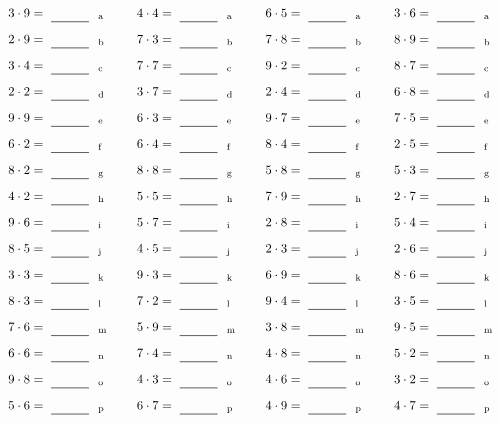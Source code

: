 \documentclass
[
  draft    = true,
  fontsize = 11pt,
  parskip  = half-
]
{scrartcl}
\begin{document}
\par\vfill\par
\begin{align*}
    \pline{3\cdot9}&=\rline{a}
  & \pline{4\cdot4}&=\rline{a}
  & \pline{6\cdot5}&=\rline{a}
  & \pline{3\cdot6}&=\rline{a} \\[1ex]
    \pline{2\cdot9}&=\rline{b}
  & \pline{7\cdot3}&=\rline{b}
  & \pline{7\cdot8}&=\rline{b}
  & \pline{8\cdot9}&=\rline{b} \\[1ex]
    \pline{3\cdot4}&=\rline{c}
  & \pline{7\cdot7}&=\rline{c}
  & \pline{9\cdot2}&=\rline{c}
  & \pline{8\cdot7}&=\rline{c} \\[1ex]
    \pline{2\cdot2}&=\rline{d}
  & \pline{3\cdot7}&=\rline{d}
  & \pline{2\cdot4}&=\rline{d}
  & \pline{6\cdot8}&=\rline{d} \\[1ex]
    \pline{9\cdot9}&=\rline{e}
  & \pline{6\cdot3}&=\rline{e}
  & \pline{9\cdot7}&=\rline{e}
  & \pline{7\cdot5}&=\rline{e} \\[1ex]
    \pline{6\cdot2}&=\rline{f}
  & \pline{6\cdot4}&=\rline{f}
  & \pline{8\cdot4}&=\rline{f}
  & \pline{2\cdot5}&=\rline{f} \\[1ex]
    \pline{8\cdot2}&=\rline{g}
  & \pline{8\cdot8}&=\rline{g}
  & \pline{5\cdot8}&=\rline{g}
  & \pline{5\cdot3}&=\rline{g} \\[1ex]
    \pline{4\cdot2}&=\rline{h}
  & \pline{5\cdot5}&=\rline{h}
  & \pline{7\cdot9}&=\rline{h}
  & \pline{2\cdot7}&=\rline{h} \\[1ex]
    \pline{9\cdot6}&=\rline{i}
  & \pline{5\cdot7}&=\rline{i}
  & \pline{2\cdot8}&=\rline{i}
  & \pline{5\cdot4}&=\rline{i} \\[1ex]
    \pline{8\cdot5}&=\rline{j}
  & \pline{4\cdot5}&=\rline{j}
  & \pline{2\cdot3}&=\rline{j}
  & \pline{2\cdot6}&=\rline{j} \\[1ex]
    \pline{3\cdot3}&=\rline{k}
  & \pline{9\cdot3}&=\rline{k}
  & \pline{6\cdot9}&=\rline{k}
  & \pline{8\cdot6}&=\rline{k} \\[1ex]
    \pline{8\cdot3}&=\rline{l}
  & \pline{7\cdot2}&=\rline{l}
  & \pline{9\cdot4}&=\rline{l}
  & \pline{3\cdot5}&=\rline{l} \\[1ex]
    \pline{7\cdot6}&=\rline{m}
  & \pline{5\cdot9}&=\rline{m}
  & \pline{3\cdot8}&=\rline{m}
  & \pline{9\cdot5}&=\rline{m} \\[1ex]
    \pline{6\cdot6}&=\rline{n}
  & \pline{7\cdot4}&=\rline{n}
  & \pline{4\cdot8}&=\rline{n}
  & \pline{5\cdot2}&=\rline{n} \\[1ex]
    \pline{9\cdot8}&=\rline{o}
  & \pline{4\cdot3}&=\rline{o}
  & \pline{4\cdot6}&=\rline{o}
  & \pline{3\cdot2}&=\rline{o} \\[1ex]
    \pline{5\cdot6}&=\rline{p}
  & \pline{6\cdot7}&=\rline{p}
  & \pline{4\cdot9}&=\rline{p}
  & \pline{4\cdot7}&=\rline{p}
\end{align*}
\end{document}
